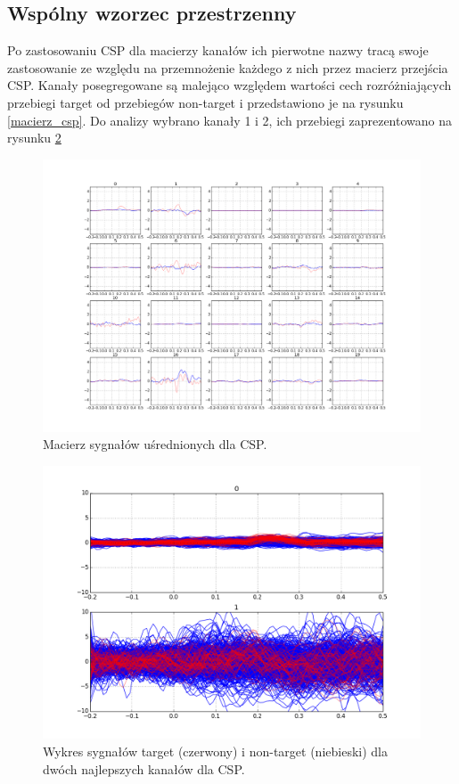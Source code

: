 \documentclass[licencjacka,openright]{pracamgr}
\begin{document}
\subsection{Wspólny wzorzec przestrzenny}

Po zastosowaniu CSP dla macierzy kanałów ich pierwotne nazwy tracą swoje zastosowanie ze względu na przemnożenie każdego z nich przez macierz przejścia CSP. Kanały posegregowane są malejąco względem wartości cech rozróżniających przebiegi target od przebiegów non-target i przedstawiono je na rysunku \ref{macierz_csp}. Do analizy wybrano kanały 1 i 2, ich przebiegi zaprezentowano na rysunku \ref{sygnal_csp}


\begin{figure}[H]
\centering
\includegraphics[scale=0.35, trim=10mm 25mm 10mm 25mm, clip=True]{pics/macierz_csp.png}
\caption{Macierz sygnałów uśrednionych dla CSP.}
\label{maciez_csp}
\end{figure}

\begin{figure}[H]
\centering
\includegraphics[scale=0.55, trim=10mm 15mm 10mm 15mm, clip=True]{pics/sygnal_csp.png}
\caption{Wykres sygnałów target (czerwony) i non-target (niebieski) dla dwóch najlepszych kanałów dla CSP.}
\label{sygnal_csp}
\end{figure}
\end{document}
